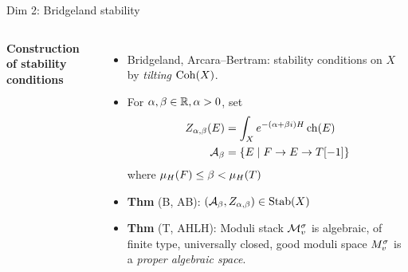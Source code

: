 \documentclass[8pt,handout]{beamer} %
\begin{document}
\begin{frame}{Dim 2: Bridgeland stability}
\begin{columns}[t]
        \textbf{Construction of stability conditions}
        \begin{itemize}
            \item<13-> Bridgeland, Arcara--Bertram: stability conditions on $X$ by \textit{tilting} $\mathrm{Coh}(X)$.
            \item<14-> For $\alpha, \beta \in \mathbb{R}, \alpha > 0$, set
            \begin{align*}
                Z_{\alpha, \beta}(E) & = \int_X e^{-(\alpha + \beta i)H}\operatorname{\mathrm{ch}}(E) \\
                \mathcal{A}_\beta & = \{ E \;|\; F \to E \to T[-1] \}
            \end{align*}
            where $\mu_H(F) \le \beta < \mu_H(T)$ %
            \item<14-> \textbf{Thm} (B, AB): $(\mathcal{A}_\beta, Z_{\alpha,\beta}) \in \operatorname{\mathrm{Stab}}(X)$
            \item<15-> \textbf{Thm} (T, AHLH): Moduli stack $\mathcal{M}^\sigma_v$ is algebraic, of finite type, universally closed, good moduli space $M^\sigma_v$ is a \textit{proper algebraic space}.
        \end{itemize}
    \end{columns}
\end{frame}
\end{document}
